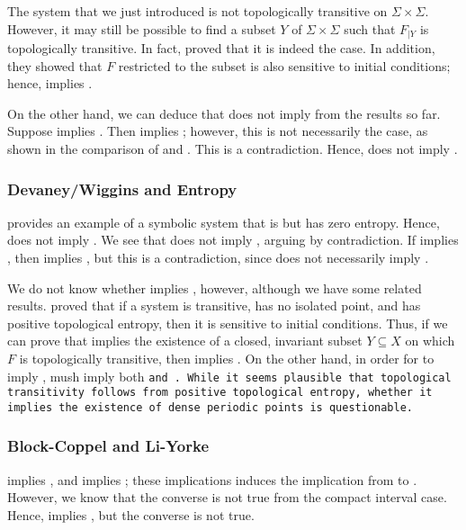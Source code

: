 \documentclass[10pt,twoside,draft]{book}
\begin{document}
The system that we just introduced is not topologically transitive on $\Sigma \times \Sigma$.
However, it may still be possible to find a subset $Y$ of $\Sigma \times \Sigma$ such that $F_{|Y}$ is topologically transitive.
In fact, \citet{auslander} proved that it is indeed the case.
In addition, they showed that $F$ restricted to the subset is also sensitive to initial conditions; hence, \blcp implies \wig.

On the other hand, we can deduce that \dev does not imply \blcp from the results so far.
Suppose \dev implies \blcp.
Then \dev implies \akm; however, this is not necessarily the case, as shown in the comparison of \dev and \akm.
This is a contradiction. 
Hence, \dev does not imply \blcp.

\subsubsection*{Devaney/Wiggins and Entropy}
\citet{glasner} provides an example of a symbolic system that is \dev but has zero entropy.
Hence, \dev does not imply \akm.
We see that \akm does not imply \dev, arguing by contradiction.
If \akm implies \dev, then \blcp implies \dev, but this is a contradiction, since \blcp does not necessarily imply \dev.

We do not know whether \blcp implies \wig, however, although we have some related results.
\citet{glasner} proved that if a system is transitive, has no isolated point, and has positive topological entropy, then it is sensitive to initial conditions.
Thus, if we can prove that \akm implies the existence of a closed, invariant subset $Y \subseteq X$ on which $F$ is topologically transitive, then \akm implies \wig.
On the other hand, in order for \akm to imply \dev, \akm mush imply both \tt and \dpp.
While it seems plausible that topological transitivity follows from positive topological entropy, whether it implies the existence of dense periodic points is questionable.


\subsubsection*{Block-Coppel and Li-Yorke}
\blcp implies \akm, and \akm implies \liy; these implications induces the implication from \blcp to \liy.
However, we know that the converse is not true from the compact interval case.
Hence, \blcp implies \liy, but the converse is not true.
\end{document}
